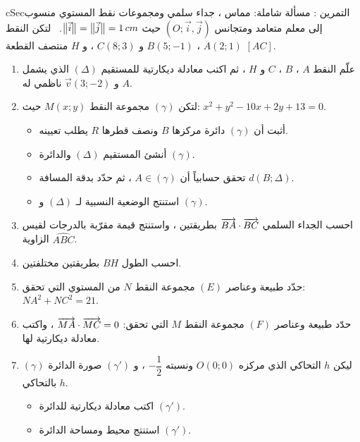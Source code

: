 \documentclass[12pt,a4paper]{article}
\newenvironment{BOX}[2]{\begin{otherlanguage}{english}\begin{arbox}{#1}{#2}}{\end{arbox}\end{otherlanguage}}
\newcounter{exo}
\newenvironment{tamrin}[1]{\stepcounter{exo}\begin{BOX}{cSec}{التمرين \theexo: #1}}{\end{BOX}}
\newenvironment{sq}{\begin{itemize}[leftmargin=2.4em,itemsep=3pt]}{\end{itemize}}
\newcommand{\qa}{\item[(أ)]}\newcommand{\qb}{\item[(ب)]}\newcommand{\qc}{\item[(جـ)]}\newcommand{\qd}{\item[(د)]}\newcommand{\qe}{\item[(هـ)]}
\begin{document}
\begin{tamrin}{مسألة شاملة: مماس ، جداء سلمي ومجموعات نقط}
المستوي منسوب إلى معلم متعامد ومتجانس $(O;\vec i,\vec j)$ حيث $\big\|\vec i\big\|=\big\|\vec j\big\|=1\,cm$. \ لتكن النقط $A(2;1)$ ، $B(5;-1)$ و $C(8;3)$ ، و $H$ منتصف القطعة $[AC]$.
\begin{enumerate}
\item علّم النقط $A$ ، $B$ ، $C$ و $H$ ، ثم اكتب معادلة ديكارتية للمستقيم $(\Delta)$ الذي يشمل $A$ و $\vec v(3;-2)$ ناظمي له.
\item لتكن $(\gamma)$ مجموعة النقط $M(x;y)$ حيث: $x^2+y^2-10x+2y+13=0$.
\begin{sq}
\qa أثبت أن $(\gamma)$ دائرة مركزها $B$ ونصف قطرها $R$ يطلب تعيينه.
\qb أنشئ المستقيم $(\Delta)$ والدائرة $(\gamma)$.
\qc تحقق حسابياً أن $A\in(\gamma)$ ، ثم حدّد بدقة المسافة $d(B;\Delta)$.
\qd استنتج الوضعية النسبية لـ $(\Delta)$ و $(\gamma)$.
\end{sq}
\item احسب الجداء السلمي $\overrightarrow{BA}\cdot\overrightarrow{BC}$ بطريقتين ، واستنتج قيمة مقرّبة بالدرجات لقيس الزاوية $\widehat{ABC}$.
\item احسب الطول $BH$ بطريقتين مختلفتين.
\item حدّد طبيعة وعناصر $(E)$ مجموعة النقط $N$ من المستوي التي تحقق: $NA^2+NC^2=21$.
\item حدّد طبيعة وعناصر $(F)$ مجموعة النقط $M$ التي تحقق: $\overrightarrow{MA}\cdot\overrightarrow{MC}=0$ ، واكتب معادلة ديكارتية لها.
\item ليكن $h$ التحاكي الذي مركزه $O(0;0)$ ونسبته $-\dfrac12$ ، و $(\gamma')$ صورة الدائرة $(\gamma)$ بالتحاكي $h$.
\begin{sq}
\qa اكتب معادلة ديكارتية للدائرة $(\gamma')$.
\qb استنتج محيط ومساحة الدائرة $(\gamma')$.
\end{sq}
\end{enumerate}
\end{tamrin}
\end{document}
